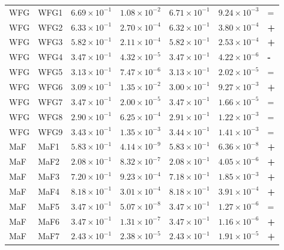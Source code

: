 \begin{table}[t]
\begin{tabular}{llrrrrl}
\addlinespace
WFG & WFG1 & $6.69\!\times\!10^{-1}$ & $1.08\!\times\!10^{-2}$ & $6.71\!\times\!10^{-1}$ & $9.24\!\times\!10^{-3}$ & = \\
WFG & WFG2 & $6.33\!\times\!10^{-1}$ & $2.70\!\times\!10^{-4}$ & $6.32\!\times\!10^{-1}$ & $3.80\!\times\!10^{-4}$ & \textbf{+} \\
WFG & WFG3 & $5.82\!\times\!10^{-1}$ & $2.11\!\times\!10^{-4}$ & $5.82\!\times\!10^{-1}$ & $2.53\!\times\!10^{-4}$ & \textbf{+} \\
WFG & WFG4 & $3.47\!\times\!10^{-1}$ & $4.32\!\times\!10^{-5}$ & $3.47\!\times\!10^{-1}$ & $4.22\!\times\!10^{-6}$ & \textbf{-} \\
WFG & WFG5 & $3.13\!\times\!10^{-1}$ & $7.47\!\times\!10^{-6}$ & $3.13\!\times\!10^{-1}$ & $2.02\!\times\!10^{-5}$ & = \\
WFG & WFG6 & $3.09\!\times\!10^{-1}$ & $1.35\!\times\!10^{-2}$ & $3.00\!\times\!10^{-1}$ & $9.27\!\times\!10^{-3}$ & \textbf{+} \\
WFG & WFG7 & $3.47\!\times\!10^{-1}$ & $2.00\!\times\!10^{-5}$ & $3.47\!\times\!10^{-1}$ & $1.66\!\times\!10^{-5}$ & = \\
WFG & WFG8 & $2.90\!\times\!10^{-1}$ & $6.25\!\times\!10^{-4}$ & $2.91\!\times\!10^{-1}$ & $1.22\!\times\!10^{-3}$ & = \\
WFG & WFG9 & $3.43\!\times\!10^{-1}$ & $1.35\!\times\!10^{-3}$ & $3.44\!\times\!10^{-1}$ & $1.41\!\times\!10^{-3}$ & = \\
\addlinespace
MaF & MaF1 & $5.83\!\times\!10^{-1}$ & $4.14\!\times\!10^{-9}$ & $5.83\!\times\!10^{-1}$ & $6.36\!\times\!10^{-8}$ & \textbf{+} \\
MaF & MaF2 & $2.08\!\times\!10^{-1}$ & $8.32\!\times\!10^{-7}$ & $2.08\!\times\!10^{-1}$ & $4.05\!\times\!10^{-6}$ & \textbf{+} \\
MaF & MaF3 & $7.20\!\times\!10^{-1}$ & $9.23\!\times\!10^{-4}$ & $7.18\!\times\!10^{-1}$ & $1.85\!\times\!10^{-3}$ & \textbf{+} \\
MaF & MaF4 & $8.18\!\times\!10^{-1}$ & $3.01\!\times\!10^{-4}$ & $8.18\!\times\!10^{-1}$ & $3.91\!\times\!10^{-4}$ & \textbf{+} \\
MaF & MaF5 & $3.47\!\times\!10^{-1}$ & $5.07\!\times\!10^{-8}$ & $3.47\!\times\!10^{-1}$ & $1.27\!\times\!10^{-6}$ & = \\
MaF & MaF6 & $3.47\!\times\!10^{-1}$ & $1.31\!\times\!10^{-7}$ & $3.47\!\times\!10^{-1}$ & $1.16\!\times\!10^{-6}$ & \textbf{+} \\
MaF & MaF7 & $2.43\!\times\!10^{-1}$ & $2.38\!\times\!10^{-5}$ & $2.43\!\times\!10^{-1}$ & $1.91\!\times\!10^{-5}$ & \textbf{+} \\
\bottomrule
\end{tabular}
\end{table}
